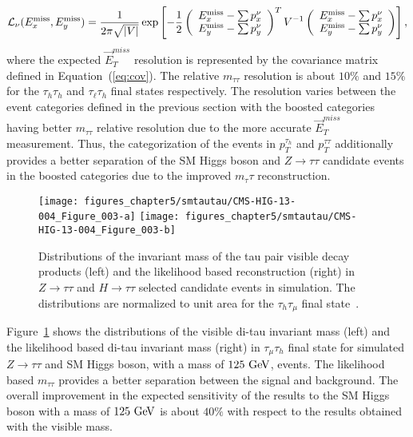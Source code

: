\begin{equation}
\mathcal{L}_{\nu} (E_{x}^{\rm miss}, E_{y}^{\rm miss}) = \frac{1}{2 \pi \sqrt{\vert V \vert}} 
 \exp \left[ -\frac{1}{2}
 \left( \begin{array}{c} E_{x}^{\rm miss} - \sum p_{x}^{\nu} \\ E_{y}^{\rm miss} - \sum p_{y}^{\nu} \end{array} \right)^{T}
 V^{-1} 
 \left( \begin{array}{c} E_{x}^{\rm miss} - \sum p_{x}^{\nu} \\ E_{y}^{\rm miss} - \sum p_{y}^{\nu} \end{array} \right)
\right],
\end{equation}
where the expected $\vec{E}_{T}^{miss}$ resolution is represented by the covariance matrix defined in Equation~(\ref{eq:cov}). The relative $m_{\tau\tau}$ resolution is about $10\%$ and $15\%$ for the $\tau_h\tau_h$ and $\tau_{\ell}\tau_h$ final states respectively. The resolution varies between the event categories defined in the previous section with the boosted categories having better $m_{\tau\tau}$ relative resolution due to the more accurate $\vec{E}_{T}^{miss}$ measurement. Thus, the categorization of the events in $p_{T}^{\tau_h}$ and  $p_{T}^{\tau\tau}$ additionally provides a better separation of the SM Higgs boson and $Z\rightarrow \tau\tau$ candidate events in the boosted categories due to the improved $m_\tau\tau$ reconstruction.   
\begin{figure}[htbp]
\centering
\texttt{[image: figures\_chapter5/smtautau/CMS-HIG-13-004\_Figure\_003-a]}
\texttt{[image: figures\_chapter5/smtautau/CMS-HIG-13-004\_Figure\_003-b]}
\caption{Distributions of the invariant mass of the tau pair visible decay products (left) and the likelihood based reconstruction (right) in $Z \rightarrow \tau\tau$ and $H \rightarrow \tau\tau$ selected candidate events in simulation. The distributions are normalized to unit area for the $\tau_{h}\tau_{\mu}$ final state~\cite{Chatrchyan:2014nva}.}
\label{fig:svfit}
\end{figure}
Figure~\ref{fig:svfit} shows the distributions of the visible di-tau invariant mass (left) and the likelihood based di-tau invariant mass (right) in $\tau_{\mu}\tau_h$ final state for simulated $Z \rightarrow \tau\tau$ and SM Higgs boson, with a mass of $125~\mathrm{Ge\kern -0.1em V}$, events. The likelihood based $m_{\tau\tau}$ provides a better separation between the signal and background. The overall improvement in the expected sensitivity of the results to the SM Higgs boson with a mass of $125~\mathrm{Ge\kern -0.1em V}$ is about $40\%$ with respect to the results obtained with the visible mass.  

